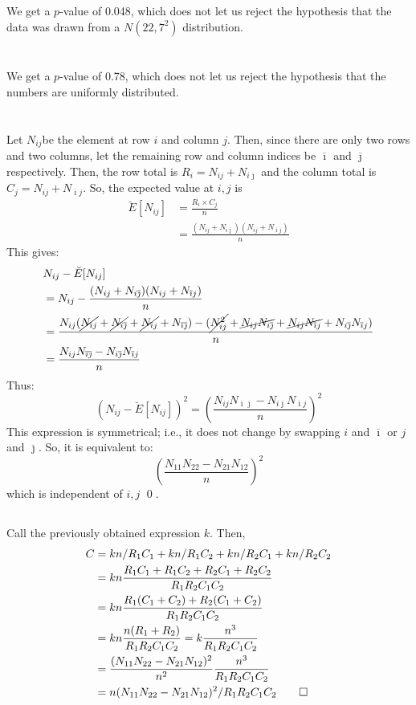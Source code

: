 \documentclass[twocolumn]{article}
\newcommand{\setsection}[1]{\setcounter{section}{#1}\addtocounter{section}{-1}\section{}}
\newcommand{\nsub}[2]{N_{#1 #2}}
\newcommand{\ovi}{\ensuremath{\overline{\imath}}}
\newcommand{\ovj}{\ensuremath{\overline{\jmath}}}
\newcommand{\na}{\ensuremath{\nsub{i}{j}}}
\newcommand{\nb}{\ensuremath{\nsub{i}{\ovj}}}
\newcommand{\nc}{\ensuremath{\nsub{\ovi}{j}}}
\newcommand{\nd}{\ensuremath{\nsub{\ovi}{\ovj}}}
\newcommand{\sumr}{\ensuremath{\na+\nb}}
\newcommand{\sumc}{\ensuremath{\na+\nc}}
\newcommand{\sums}{\ensuremath{n}}
\begin{document}
\subsection{}

We get a $p$-value of 0.048, which does not let us reject the hypothesis that the data was drawn from a $N(22,7^2)$ distribution.

\setsection{25}

We get a $p$-value of 0.78, which does not let us reject the hypothesis that the numbers are uniformly distributed.

\setsection{29}

\subsection{}

Let \na be the element at row $i$ and column $j$. Then, since there are only two rows and two columns, let the remaining row and column indices be \ovi{} and \ovj{} respectively.
Then, the row total is $R_i=\sumr$ and the column total is $C_j=\sumc$. So, the expected value at $i,j$ is\begin{align*}
\breve{E}[\na]
&=\frac{R_i\times C_j}{\sums}	\\
&=\frac{(\sumr)(\sumc)}{\sums}
\end{align*}
This gives:\begin{align*}
&\na-\breve{E}[\na]\\
&=\na-\frac{(\sumr)(\sumc)}{\sums}\\
&=\frac{\na(\cancel{\na}+\cancel{\nb}+\cancel{\nc}+\nd)-(\cancel{\na^2}+\cancel{\na\nb}+\cancel{\na\nc}+\nb\nc)}{\sums}\\
&=\frac{\na\nd-\nb\nc}{\sums}\\
\end{align*}
Thus:\[
(\na-\breve{E}[\na])^2=\left(\frac{\na\nd-\nb\nc}{\sums}\right)^2
\]
This expression is symmetrical; i.e., it does not change by swapping $i$ and \ovi{} or $j$ and \ovj{}. So, it is equivalent to:\[
\left(\frac{N_{11}N_{22}-N_{21}N_{12}}{n}\right)^2
\]
which is independent of $i,j$ \qed.

\subsection{}

Call the previously obtained expression $k$. Then, \begin{align*}
C
&=kn/R_1C_1+kn/R_1C_2+kn/R_2C_1+kn/R_2C_2\\
&=kn\frac{R_1C_1+R_1C_2+R_2C_1+R_2C_2}{R_1R_2C_1C_2}\\
&=kn\frac{R_1(C_1+C_2)+R_2(C_1+C_2)}{R_1R_2C_1C_2}\\
&=kn\frac{n(R_1+R_2)}{R_1R_2C_1C_2}=k\frac{n^3}{R_1R_2C_1C_2}\\
&=\frac{(N_{11}N_{22}-N_{21}N_{12})^2}{n^2}\frac{n^3}{R_1R_2C_1C_2}\\
&=n(N_{11}N_{22}-N_{21}N_{12})^2/R_1R_2C_1C_2\qed
\end{align*}
\end{document}
